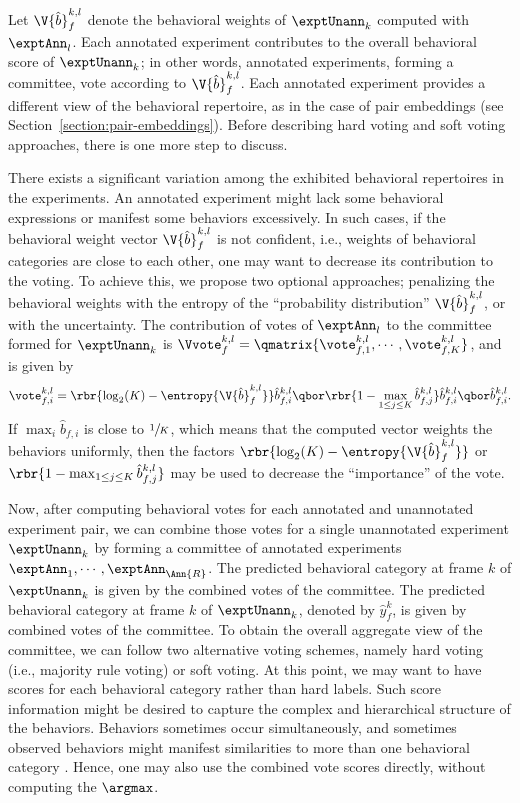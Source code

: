 Let $\V{\hat{b}}_f^{k,l}$ denote the behavioral weights of $\exptUnann_k$ computed with $\exptAnn_l$.
Each annotated experiment contributes to the overall behavioral score of $\exptUnann_k$; in other words, annotated experiments, forming a committee,  vote according to $\V{\hat{b}}_f^{k,l}$.
Each annotated experiment provides a different view of the behavioral repertoire, as in the case of pair embeddings (see Section~\ref{section:pair-embeddings}).
Before describing hard voting and soft voting approaches, there is one more step to discuss.

There exists a significant variation among the exhibited behavioral repertoires in the experiments.
An annotated experiment might lack some behavioral expressions or manifest some behaviors excessively.
In such cases, if the behavioral weight vector $\V{\hat{b}}_f^{k,l}$ is not confident, i.e., weights of behavioral categories are close to each other, one may want to decrease its contribution to the voting.
To achieve this, we propose two optional approaches; penalizing the behavioral weights with the entropy of the ``probability distribution'' $\V{\hat{b}}_f^{k,l}$, or with the uncertainty.
The contribution of votes of $\exptAnn_l$ to the committee formed for $\exptUnann_k$ is $\Vvote_f^{k,l} = \qmatrix{\vote_{f,1}^{k,l}, \cdots, \vote_{f,K}^{k,l}}$, and is given by
\begin{equation}
	\vote_{f,i}^{k,l} = \rbr{\log_2(K) - \entropy{\V{\hat{b}}_f^{k,l}}} \hat{b}_{f,i}^{k,l} \qbor \rbr{ 1 - \max_{1 \leq j \leq K} \hat{b}_{f,j}^{k,l}} \hat{b}_{f,i}^{k,l} \qbor \hat{b}_{f,i}^{k,l}.
\end{equation}
If $\max_i \hat{b}_{f,i}$ is close to $\sfrac{1}{K}$, which means that the computed vector weights the behaviors uniformly, then the factors $\rbr{\log_2(K) - \entropy{\V{\hat{b}}_f^{k,l}}}$ or $\rbr{ 1 - \max_{1 \leq j \leq K} \hat{b}_{f,j}^{k,l}}$ may be used to decrease the ``importance'' of the vote.

Now, after computing behavioral votes for each annotated and unannotated experiment pair, we can combine those votes for a single unannotated experiment $\exptUnann_k$  by forming a committee of annotated experiments $\exptAnn_1, \cdots, \exptAnn_{\Ann{R}}$.
The predicted behavioral category at frame $k$ of $\exptUnann_k$ is given by the combined votes of the committee.
The predicted behavioral category at frame $k$ of $\exptUnann_k$, denoted by $\hat{y}^k_f$, is given by combined votes of the committee.
To obtain the overall aggregate view of the committee, we can follow two alternative voting schemes, namely hard voting (i.e., majority rule voting) or soft voting.
At this point, we may want to have scores for each behavioral category rather than hard labels.
Such score information might be desired to capture the complex and hierarchical structure of the behaviors.
Behaviors sometimes occur simultaneously, and sometimes observed behaviors might manifest similarities to more than one behavioral category \citep{berman_predictability_2016}.
Hence, one may also use the combined vote scores directly, without computing the $\argmax$.

